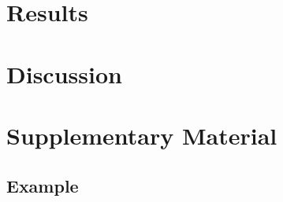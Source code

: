 \documentclass{article}
\begin{document}
\section{Results}
\label{section:results}

\section{Discussion}
\label{subsection:discussion}




\section{Supplementary Material}
\label{section:supplementary-material}

\subsection{Example}
\label{subsection:supplement-example}
\end{document}
